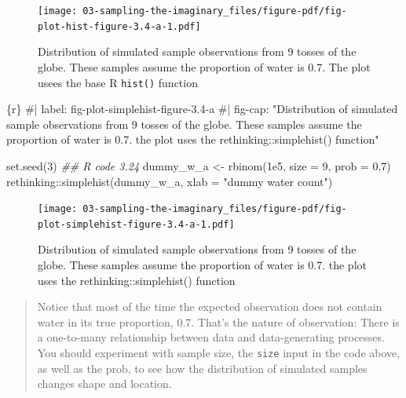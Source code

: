 \documentclass[
  letterpaper,
  DIV=11,
  numbers=noendperiod]{scrreprt}
\newenvironment{Shaded}{\begin{snugshade}}{\end{snugshade}}
\newcommand{\AttributeTok}[1]{\textcolor[rgb]{0.40,0.45,0.13}{#1}}
\newcommand{\CommentTok}[1]{\textcolor[rgb]{0.37,0.37,0.37}{#1}}
\newcommand{\DecValTok}[1]{\textcolor[rgb]{0.68,0.00,0.00}{#1}}
\newcommand{\DocumentationTok}[1]{\textcolor[rgb]{0.37,0.37,0.37}{\textit{#1}}}
\newcommand{\FloatTok}[1]{\textcolor[rgb]{0.68,0.00,0.00}{#1}}
\newcommand{\FunctionTok}[1]{\textcolor[rgb]{0.28,0.35,0.67}{#1}}
\newcommand{\InformationTok}[1]{\textcolor[rgb]{0.37,0.37,0.37}{#1}}
\newcommand{\NormalTok}[1]{\textcolor[rgb]{0.00,0.23,0.31}{#1}}
\newcommand{\OtherTok}[1]{\textcolor[rgb]{0.00,0.23,0.31}{#1}}
\newcommand{\SpecialCharTok}[1]{\textcolor[rgb]{0.37,0.37,0.37}{#1}}
\newcommand{\StringTok}[1]{\textcolor[rgb]{0.13,0.47,0.30}{#1}}
\begin{document}
\begin{figure}[H]

{\centering \texttt{[image: 03-sampling-the-imaginary\_files/figure-pdf/fig-plot-hist-figure-3.4-a-1.pdf]}

}

\caption{\label{fig-plot-hist-figure-3.4-a}Distribution of simulated
sample observations from 9 tosses of the globe. These samples assume the
proportion of water is 0.7. The plot usees the base R \texttt{hist()}
function}

\end{figure}

\begin{Shaded}
\begin{Highlighting}[]
\InformationTok{\textasciigrave{}\textasciigrave{}\textasciigrave{}\{r\}}
\CommentTok{\#| label: fig{-}plot{-}simplehist{-}figure{-}3.4{-}a}
\CommentTok{\#| fig{-}cap: "Distribution of simulated sample observations from 9 tosses of the globe. These samples assume the proportion of water is 0.7. the plot uses the rethinking::simplehist() function"}

\FunctionTok{set.seed}\NormalTok{(}\DecValTok{3}\NormalTok{)}
\DocumentationTok{\#\# R code 3.24}
\NormalTok{dummy\_w\_a }\OtherTok{\textless{}{-}} \FunctionTok{rbinom}\NormalTok{(}\FloatTok{1e5}\NormalTok{, }\AttributeTok{size =} \DecValTok{9}\NormalTok{, }\AttributeTok{prob =} \FloatTok{0.7}\NormalTok{)}
\NormalTok{rethinking}\SpecialCharTok{::}\FunctionTok{simplehist}\NormalTok{(dummy\_w\_a, }\AttributeTok{xlab =} \StringTok{"dummy water count"}\NormalTok{)}
\InformationTok{\textasciigrave{}\textasciigrave{}\textasciigrave{}}
\end{Highlighting}
\end{Shaded}

\begin{figure}[H]

{\centering \texttt{[image: 03-sampling-the-imaginary\_files/figure-pdf/fig-plot-simplehist-figure-3.4-a-1.pdf]}

}

\caption{\label{fig-plot-simplehist-figure-3.4-a}Distribution of
simulated sample observations from 9 tosses of the globe. These samples
assume the proportion of water is 0.7. the plot uses the
rethinking::simplehist() function}

\end{figure}

\begin{quote}
Notice that most of the time the expected observation does not contain
water in its true proportion, 0.7. That's the nature of observation:
There is a one-to-many relationship between data and data-generating
processes. You should experiment with sample size, the \texttt{size}
input in the code above, as well as the prob, to see how the
distribution of simulated samples changes shape and location.
\end{quote}
\end{document}
